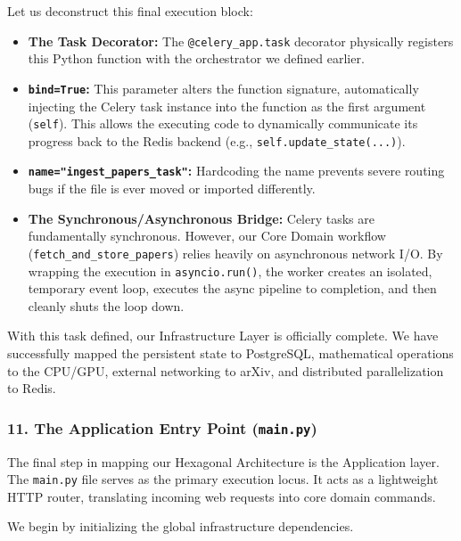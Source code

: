 Let us deconstruct this final execution block:
\begin{itemize}
    \item \textbf{The Task Decorator:} The \texttt{@celery\_app.task} decorator physically registers this Python function with the orchestrator we defined earlier.
    \item \textbf{\texttt{bind=True}:} This parameter alters the function signature, automatically injecting the Celery task instance into the function as the first argument (\texttt{self}). This allows the executing code to dynamically communicate its progress back to the Redis backend (e.g., \texttt{self.update\_state(...)}).
    \item \textbf{\texttt{name="ingest\_papers\_task"}:} Hardcoding the name prevents severe routing bugs if the file is ever moved or imported differently.
    \item \textbf{The Synchronous/Asynchronous Bridge:} Celery tasks are fundamentally synchronous. However, our Core Domain workflow (\texttt{fetch\_and\_store\_papers}) relies heavily on asynchronous network I/O. By wrapping the execution in \texttt{asyncio.run()}, the worker creates an isolated, temporary event loop, executes the async pipeline to completion, and then cleanly shuts the loop down.
\end{itemize}

With this task defined, our Infrastructure Layer is officially complete. We have successfully mapped the persistent state to PostgreSQL, mathematical operations to the CPU/GPU, external networking to arXiv, and distributed parallelization to Redis.


\subsubsection*{11. The Application Entry Point (\texttt{main.py})}

The final step in mapping our Hexagonal Architecture is the Application layer. The \texttt{main.py} file serves as the primary execution locus. It acts as a lightweight HTTP router, translating incoming web requests into core domain commands.

We begin by initializing the global infrastructure dependencies.

